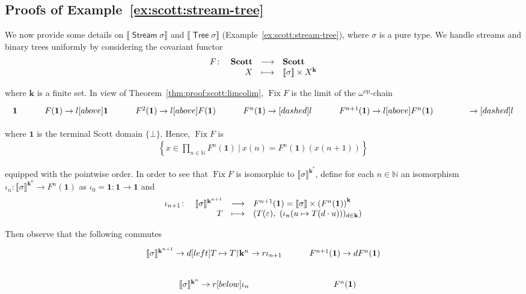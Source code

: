 \documentclass[%
  a4paper,
  UKenglish,
  cleveref,
  autoref,
  thm-restate,
  numberwithinsect,
]{lipics-v2021}
\newcommand\longto\longrightarrow
\newcommand\restr{\mathord{\upharpoonright}}	%
\newcommand\NN{\mathbb{N}}
\newcommand\one{\mathbf{1}}	%
\newcommand\I[1]{\llbracket #1 \rrbracket} %
\newcommand\es{\varepsilon}	%
\newcommand\op{{\mathrm{op}}}
\newcommand\Fix{\mathop{\mathrm{Fix}}}
\newcommand\Scott{\mathbf{Scott}}
\newcommand\term[1]{\mathsf{#1}}
\newcommand\type[1]{\term{#1}}
\newcommand\Dir{{\mathbf{k}}}	%
\newcommand\arrow\to
\newcommand\Stream{\mathop{\type{Stream}}}
\newcommand\Tree{\mathop{\type{Tree}}}
\newcommand\PTbis{\sigma}	%
\begin{document}
\subsection{Proofs of Example~\ref{ex:scott:stream-tree}}
\label{sec:proof:sem:stream-tree}

We now provide some details 
on $\I{\Stream\PTbis}$ and $\I{\Tree\PTbis}$
(Example~\ref{ex:scott:stream-tree}),
where $\PTbis$ is a pure type.
We handle streams and binary trees
uniformly by considering the covariant functor
\[
\begin{array}{l r c l}
  F \colon
& \Scott
& \longto
& \Scott
\\
%
& X
& \longmapsto
& \I\PTbis \times X^\Dir
\end{array}
\]

\noindent
where $\Dir$ is a finite set.
In view of Theorem~\ref{thm:proof:scott:limcolim},
$\Fix F$ is the limit of the $\omega^\op$-chain
\[
\begin{tikzcd} %
  \one
& F(\one)
  \arrow{l}[above]{\one}
& F^2(\one)
  \arrow{l}[above]{F(\one)}
& F^n(\one)
  \arrow[dashed]{l}
& F^{n+1}(\one)
  \arrow{l}[above]{F^n(\one)}
& \phantom{F}
  \arrow[dashed]{l}
\end{tikzcd}
\]

\noindent
where $\one$ is the terminal Scott domain $\{\bot\}$.
Hence, $\Fix F$ is
\[
\begin{array}{c}
  \left\{
  x \in \prod_{n \in \NN} F^n(\one)
  ~\Big|~
  x(n) = F^n(\one)(x(n+1))
  \right\}
\end{array}
\]

\noindent
equipped with the pointwise order.
In order to see that $\Fix F$ is isomorphic to $\I\PTbis^{\Dir^*}$,
define for each $n \in \NN$ an
isomorphism $\iota_n \colon \I\PTbis^{\Dir^n} \to F^n(\one)$
as $\iota_0 = \one \colon \one \to \one$
and
\[
\begin{array}{l r c l}
  \iota_{n+1} \colon
& \I\PTbis^{\Dir^{n+1}}
& \longto
& F^{n+1}(\one) = \I\PTbis \times \left( F^n(\one) \right)^\Dir
\\
%
& T
& \longmapsto
& \left( T(\es),~ (\iota_n(u \mapsto T(d \cdot u)))_{d \in \Dir}  \right)
\end{array}
\]

\noindent
Then observe that the following commutes
\[
\begin{tikzcd}
  \I\PTbis^{\Dir^{n+1}}
  \arrow{d}[left]{T \mapsto T\restr \Dir^n}
  \arrow{r}{\iota_{n+1}}
& F^{n+1}(\one)
  \arrow{d}{F^n(\one)}
\\
  \I\PTbis^{\Dir^{n}}
  \arrow{r}[below]{\iota_{n}}
& F^n(\one)
\end{tikzcd}
\]
\end{document}
